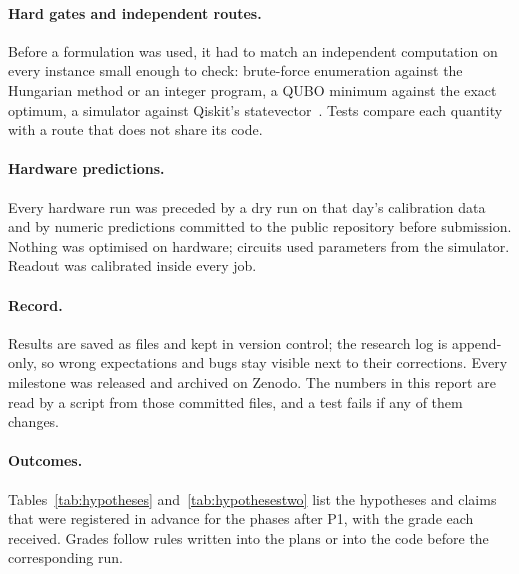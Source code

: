 \documentclass[11pt,a4paper]{article}
\begin{document}
\paragraph{Hard gates and independent routes.} Before a formulation was used, it had to match an independent computation on every
instance small enough to check: brute-force enumeration against the Hungarian method or an integer program, a QUBO minimum against the
exact optimum, a simulator against Qiskit's statevector~\cite{javadi2024qiskit}. Tests compare each quantity with a route that does
not share its code.

\paragraph{Hardware predictions.} Every hardware run was preceded by a dry run on that day's calibration data and by numeric
predictions committed to the public repository before submission. Nothing was optimised on hardware; circuits used parameters from the
simulator. Readout was calibrated inside every job.

\paragraph{Record.} Results are saved as files and kept in version control; the research log is append-only, so wrong expectations and
bugs stay visible next to their corrections. Every milestone was released and archived on Zenodo. The numbers in this report are read
by a script from those committed files, and a test fails if any of them changes.

\paragraph{Outcomes.} Tables~\ref{tab:hypotheses} and~\ref{tab:hypothesestwo} list the hypotheses and claims that were registered in
advance for the phases after P1, with the grade each received. Grades follow rules written into the plans or into the code before the
corresponding run.
\end{document}
